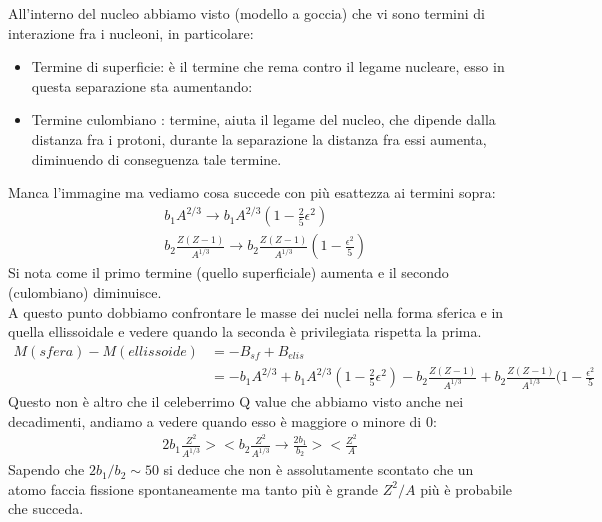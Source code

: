 All'interno del nucleo abbiamo visto (modello a goccia) che vi sono termini di interazione fra i 
nucleoni, in particolare:
\begin{itemize}
        \item Termine di superficie: è il termine che rema contro il legame nucleare, esso 
                in questa separazione sta aumentando:
        \item Termine culombiano : termine, aiuta il legame del nucleo, che dipende dalla distanza fra i protoni, durante la 
                separazione la distanza fra essi aumenta, diminuendo di conseguenza tale termine.
\end{itemize}
Manca l'immagine ma vediamo cosa succede con più esattezza ai termini sopra:
\begin{align*}
    &b_{1}A^{2/3}\rightarrow b_{1}A^{2/3}(1-\frac{2}{5}\epsilon^2)\\[1em]
    &b_{2}\frac{Z(Z-1)}{A^{1/3}}\rightarrow b_{2}\frac{Z(Z-1)}{A^{1/3}}(1-\frac{\epsilon^2}{5})
\end{align*}
Si nota come il primo termine (quello superficiale) aumenta e il secondo (culombiano) diminuisce.\\
A questo punto dobbiamo confrontare le masse dei nuclei nella forma sferica e in quella ellissoidale e
vedere quando la seconda è privilegiata rispetta la prima.
\begin{align*}
        M(sfera)-M(ellissoide) &= -B_{sf}+B_{elis} \\
                               &= -b_{1}A^{2/3}+b_{1}A^{2/3}(1-\frac{2}{5}\epsilon^2)-b_{2}\frac{Z(Z-1)}{A^{1/3}}+b_{2}\frac{Z(Z-1)}{A^{1/3}}(1-\frac{\epsilon^2}{5}
\end{align*}
Questo non è altro che il celeberrimo Q value che abbiamo visto anche nei decadimenti, 
andiamo a vedere quando esso è maggiore o minore di 0:
\begin{align*}
    2b_{1}\frac{Z^2}{A^{1/3}}>< b_{2}\frac{Z^2}{A^{1/3}}\rightarrow \frac{2b_{1}}{b_{2}}><\frac{Z^2}{A}
\end{align*}
Sapendo che $2b_{1}/b_{2}\sim50$ si deduce che non è assolutamente scontato che un atomo faccia
fissione spontaneamente ma tanto più è grande $Z^2/A$ più è probabile che succeda. 
\newpage
